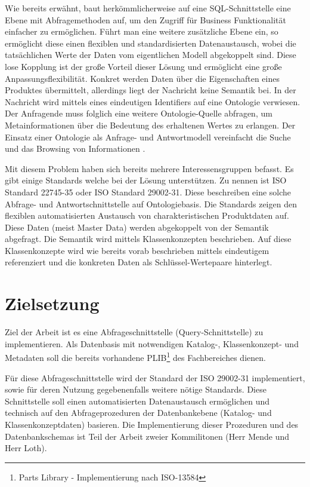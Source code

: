 Wie bereits erwähnt, baut herkömmlicherweise auf eine SQL-Schnittstelle eine Ebene mit Abfragemethoden auf, um den Zugriff für Business Funktionalität einfacher zu ermöglichen. Führt man eine weitere zusätzliche Ebene ein, so ermöglicht diese einen flexiblen und standardisierten Datenaustausch, wobei die tatsächlichen Werte der Daten vom eigentlichen Modell abgekoppelt sind. Diese lose Kopplung ist der große Vorteil dieser Lösung und ermöglicht eine große Anpassungsflexibilität. Konkret werden Daten über die Eigenschaften eines Produktes übermittelt, allerdings liegt der Nachricht keine Semantik bei. In der Nachricht wird mittels eines eindeutigen Identifiers auf eine \gls{Ontologie} verwiesen. Der Anfragende muss folglich eine weitere \gls{Ontologie}-Quelle abfragen, um Metainformationen über die Bedeutung des erhaltenen Wertes zu erlangen. 
Der Einsatz einer \gls{Ontologie} als Anfrage- und Antwortmodell vereinfacht die Suche und das Browsing von Informationen \citep[vgl.][S. 24f]{Hemmje}.

Mit diesem Problem haben sich bereits mehrere Interessensgruppen befasst. Es gibt einige Standards welche bei der Lösung unterstützen. Zu nennen ist ISO Standard 22745-35 oder ISO Standard 29002-31. Diese beschreiben eine solche Abfrage- und Antwortschnittstelle auf Ontologiebasis. Die Standards zeigen den flexiblen automatisierten Austausch von charakteristischen Produktdaten auf. Diese Daten (meist Master Data) werden abgekoppelt von der Semantik abgefragt. Die Semantik wird mittels Klassenkonzepten beschrieben. Auf diese Klassenkonzepte wird wie bereits vorab beschrieben mittels eindeutigem  referenziert und die konkreten Daten als Schlüssel-Wertepaare hinterlegt.  

\section{Zielsetzung}

Ziel der Arbeit ist es eine Abfrageschnittstelle (Query-Schnittstelle) zu implementieren. Als Datenbasis mit notwendigen Katalog-, Klassenkonzept- und Metadaten soll die bereits vorhandene PLIB\footnote{Parts Library - Implementierung nach ISO-13584} des Fachbereiches dienen. 

Für diese Abfrageschnittstelle wird der Standard der ISO 29002-31 implementiert, sowie für deren Nutzung gegebenenfalls weitere nötige Standards. Diese Schnittstelle soll einen automatisierten Datenaustausch ermöglichen und technisch auf den Abfrageprozeduren der Datenbankebene (Katalog- und Klassenkonzeptdaten) basieren. Die Implementierung dieser Prozeduren und des Datenbankschemas ist Teil der Arbeit zweier Kommilitonen (Herr Mende und Herr Loth).
 
